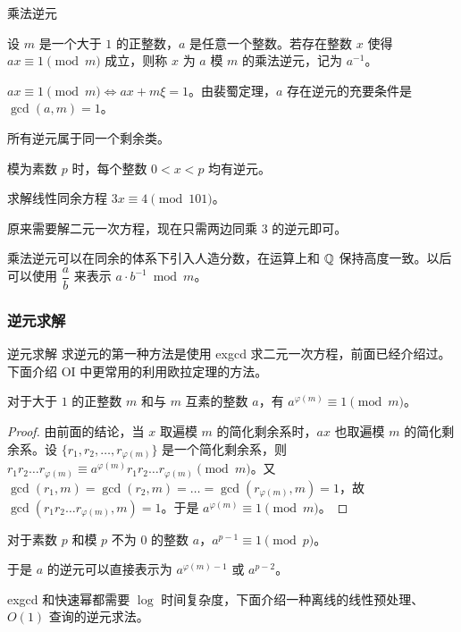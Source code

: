\documentclass[../main.tex]{subfiles}
\begin{document}
\begin{frame}{乘法逆元}
\begin{defi}[逆元]
设 $m$ 是一个大于 $1$ 的正整数，$a$ 是任意一个整数。若存在整数 $x$ 使得 $ax\equiv 1\pmod m$ 成立，则称 $x$ 为 $a$ 模 $m$ 的乘法逆元，记为 $a^{-1}$。
\end{defi} \pause

$ax\equiv 1\pmod m\iff ax+m\xi=1$。由裴蜀定理，$a$ 存在逆元的充要条件是 $\gcd(a,m)=1$。 \pause

所有逆元属于同一个剩余类。 \pause

模为素数 $p$ 时，每个整数 $0<x<p$ 均有逆元。
\end{frame}

\begin{frame}
\begin{eg}
求解线性同余方程 $3x\equiv 4\pmod{101}$。 \pause

原来需要解二元一次方程，现在只需两边同乘 $3$ 的逆元即可。
\end{eg} \pause

乘法逆元可以在同余的体系下引入人造分数，在运算上和 $\mathbb{Q}$ 保持高度一致。以后可以使用 $\dfrac{a}{b}$ 来表示 $a\cdot b^{-1}\bmod m$。
\end{frame}

\subsubsection{逆元求解}

\begin{frame}{逆元求解}
求逆元的第一种方法是使用 exgcd 求二元一次方程，前面已经介绍过。下面介绍 OI 中更常用的利用欧拉定理的方法。 \pause

\begin{theo}[欧拉定理]
对于大于 $1$ 的正整数 $m$ 和与 $m$ 互素的整数 $a$，有 $a^{\varphi(m)}\equiv 1\pmod m$。
\end{theo} \pause

\begin{proof}
由前面的结论，当 $x$ 取遍模 $m$ 的简化剩余系时，$ax$ 也取遍模 $m$ 的简化剩余系。设 $\{r_1,r_2,\dots,r_{\varphi(m)}\}$ 是一个简化剩余系，则 $r_1r_2\dots r_{\varphi(m)}\equiv a^{\varphi(m)}r_1r_2\dots r_{\varphi(m)}\pmod m$。又 $\gcd(r_1,m)=\gcd(r_2,m)=\dots=\gcd(r_{\varphi(m)},m)=1$，故 $\gcd(r_1r_2\dots r_{\varphi(m)},m)=1$。于是 $a^{\varphi(m)}\equiv 1\pmod m$。
\end{proof}

\end{frame}

\begin{frame}
\begin{theo}[费马小定理]
对于素数 $p$ 和模 $p$ 不为 $0$ 的整数 $a$，$a^{p-1}\equiv 1\pmod p$。
\end{theo} \pause

于是 $a$ 的逆元可以直接表示为 $a^{\varphi(m)-1}$ 或 $a^{p-2}$。 \pause

exgcd 和快速幂都需要 $\log$ 时间复杂度，下面介绍一种离线的线性预处理、$O(1)$ 查询的逆元求法。
\end{frame}
\end{document}
